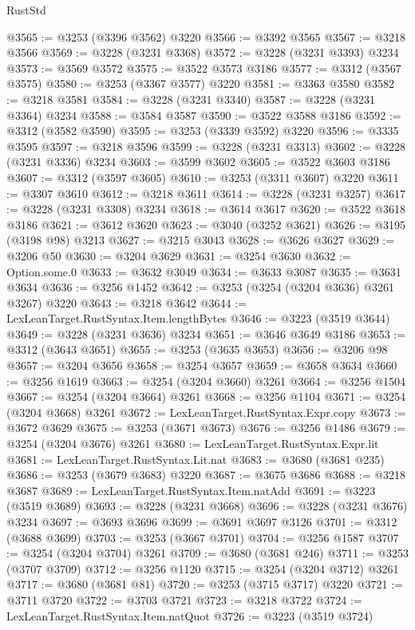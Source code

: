 \begin{lexlean}{RustStd}
\begin{coremodule}
{\begin{coremodule}
{{{{{{{{{{{{{{{{{{{{{{{{{{{{{{{{{{{{{@3565 := @3253 (@3396 @3562) @3220
@3566 := @3392 @3565
@3567 := @3218 @3566
@3569 := @3228 (@3231 @3368)
@3572 := @3228 (@3231 @3393) @3234
@3573 := @3569 @3572
@3575 := @3522 @3573 @3186
@3577 := @3312 (@3567 @3575)
@3580 := @3253 (@3367 @3577) @3220
@3581 := @3363 @3580
@3582 := @3218 @3581
@3584 := @3228 (@3231 @3340)
@3587 := @3228 (@3231 @3364) @3234
@3588 := @3584 @3587
@3590 := @3522 @3588 @3186
@3592 := @3312 (@3582 @3590)
@3595 := @3253 (@3339 @3592) @3220
@3596 := @3335 @3595
@3597 := @3218 @3596
@3599 := @3228 (@3231 @3313)
@3602 := @3228 (@3231 @3336) @3234
@3603 := @3599 @3602
@3605 := @3522 @3603 @3186
@3607 := @3312 (@3597 @3605)
@3610 := @3253 (@3311 @3607) @3220
@3611 := @3307 @3610
@3612 := @3218 @3611
@3614 := @3228 (@3231 @3257)
@3617 := @3228 (@3231 @3308) @3234
@3618 := @3614 @3617
@3620 := @3522 @3618 @3186
@3621 := @3612 @3620
@3623 := @3040 (@3252 @3621)
@3626 := @3195 (@3198 @98) @3213
@3627 := @3215 @3043
@3628 := @3626 @3627
@3629 := @3206 @50
@3630 := @3204 @3629
@3631 := @3254 @3630
@3632 := Option.some.{0}
@3633 := @3632 @3049
@3634 := @3633 @3087
@3635 := @3631 @3634
@3636 := @3256 @1452
@3642 := @3253 (@3254 (@3204 @3636) @3261 @3267) @3220
@3643 := @3218 @3642
@3644 := LexLeanTarget.RustSyntax.Item.lengthBytes
@3646 := @3223 (@3519 @3644)
@3649 := @3228 (@3231 @3636) @3234
@3651 := @3646 @3649 @3186
@3653 := @3312 (@3643 @3651)
@3655 := @3253 (@3635 @3653)
@3656 := @3206 @98
@3657 := @3204 @3656
@3658 := @3254 @3657
@3659 := @3658 @3634
@3660 := @3256 @1619
@3663 := @3254 (@3204 @3660) @3261
@3664 := @3256 @1504
@3667 := @3254 (@3204 @3664) @3261
@3668 := @3256 @1104
@3671 := @3254 (@3204 @3668) @3261
@3672 := LexLeanTarget.RustSyntax.Expr.copy
@3673 := @3672 @3629
@3675 := @3253 (@3671 @3673)
@3676 := @3256 @1486
@3679 := @3254 (@3204 @3676) @3261
@3680 := LexLeanTarget.RustSyntax.Expr.lit
@3681 := LexLeanTarget.RustSyntax.Lit.nat
@3683 := @3680 (@3681 @235)
@3686 := @3253 (@3679 @3683) @3220
@3687 := @3675 @3686
@3688 := @3218 @3687
@3689 := LexLeanTarget.RustSyntax.Item.natAdd
@3691 := @3223 (@3519 @3689)
@3693 := @3228 (@3231 @3668)
@3696 := @3228 (@3231 @3676) @3234
@3697 := @3693 @3696
@3699 := @3691 @3697 @3126
@3701 := @3312 (@3688 @3699)
@3703 := @3253 (@3667 @3701)
@3704 := @3256 @1587
@3707 := @3254 (@3204 @3704) @3261
@3709 := @3680 (@3681 @246)
@3711 := @3253 (@3707 @3709)
@3712 := @3256 @1120
@3715 := @3254 (@3204 @3712) @3261
@3717 := @3680 (@3681 @81)
@3720 := @3253 (@3715 @3717) @3220
@3721 := @3711 @3720
@3722 := @3703 @3721
@3723 := @3218 @3722
@3724 := LexLeanTarget.RustSyntax.Item.natQuot
@3726 := @3223 (@3519 @3724)
}}}}}}}}}}}}}}}}}}}}}}}}}}}}}}}}}}}}}
\end{coremodule}}
\end{coremodule}
\end{lexlean}
